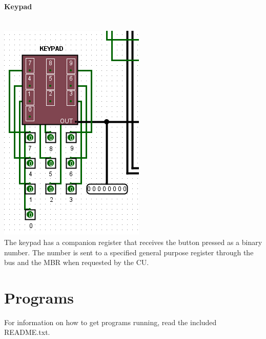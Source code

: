 \documentclass{mcgillhomework}
\begin{document}
	\paragraph{Keypad}~
	\\ \includegraphics[scale=0.5]{KP}\\The keypad has a companion register that receives the button pressed as a binary number. The number is sent to a specified general purpose register through the bus and the MBR when requested by the CU.
	\section{Programs}
	For information on how to get programs running, read the included README.txt.
\end{document}
